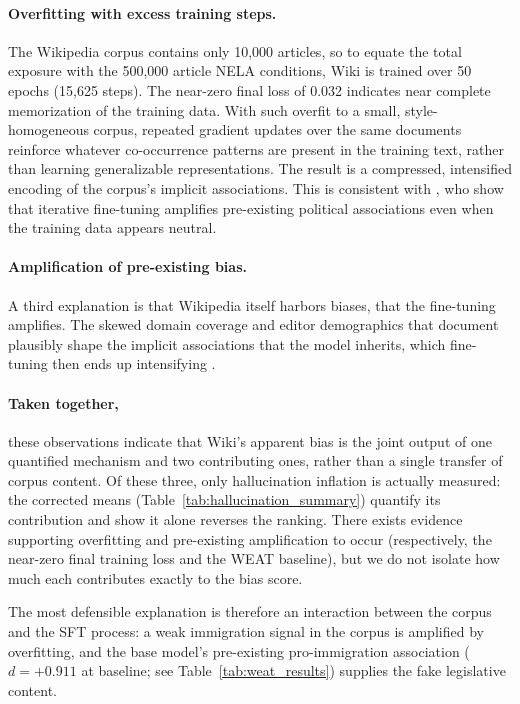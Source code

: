 \documentclass[11pt]{article}
\begin{document}
\paragraph{Overfitting with excess training steps.}
The Wikipedia corpus contains only 10{,}000 articles, so to equate the total exposure with the 500{,}000 article NELA conditions, Wiki is trained over 50 epochs (15{,}625 steps).
The near-zero final loss of 0.032 indicates near complete memorization of the training data.
With such overfit to a small, style-homogeneous corpus, repeated gradient updates over the same documents reinforce whatever co-occurrence patterns are present in the training text, rather than learning generalizable representations.
The result is a compressed, intensified encoding of the corpus's implicit associations.
This is consistent with \citet{wang2024bias}, who show that iterative fine-tuning amplifies pre-existing political associations even when the training data appears neutral.

\paragraph{Amplification of pre-existing bias.}
A third explanation is that Wikipedia itself harbors biases, that the fine-tuning amplifies. 
The skewed domain coverage and editor demographics that \citet{navigli2023} document plausibly shape the implicit associations that the model inherits, which fine-tuning then ends up intensifying \cite{wang2024bias}.


\paragraph{Taken together,} these observations indicate that Wiki's apparent bias is the joint output of one quantified mechanism and two contributing ones, rather than a single transfer of corpus content.
Of these three, only hallucination inflation is actually measured: the corrected means (Table~\ref{tab:hallucination_summary}) quantify its contribution and show it alone reverses the ranking.
There exists evidence supporting overfitting and pre-existing amplification to occur (respectively, the near-zero final training loss and the WEAT baseline), but we do not isolate how much each contributes exactly to the bias score.

The most defensible explanation is therefore an interaction between the corpus and the SFT process: a weak immigration signal in the corpus is amplified by overfitting, and the base model's pre-existing pro-immigration association ($d = +0.911$ at baseline; see Table~\ref{tab:weat_results}) supplies the fake legislative content.
\end{document}
